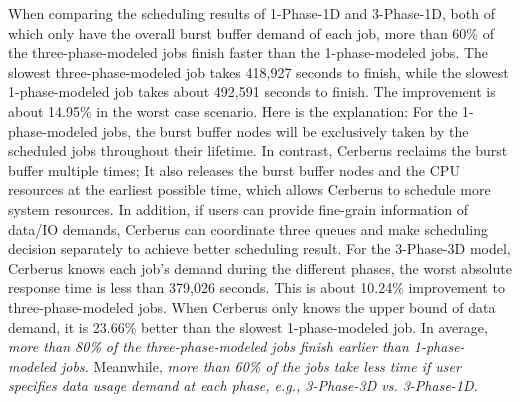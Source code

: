 When comparing the scheduling results of 1-Phase-1D and 3-Phase-1D,
both of which only have the overall burst buffer demand of each job,
more than 60\% of the three-phase-modeled jobs finish faster than the 1-phase-modeled jobs.
The slowest three-phase-modeled job takes 418,927 seconds to finish,
while the slowest 1-phase-modeled job takes about 492,591 seconds to finish.
The improvement is about 14.95\% in the worst case scenario.
Here is the explanation: For the 1-phase-modeled jobs, the burst buffer nodes will be exclusively
taken by the scheduled jobs throughout their lifetime. In contrast, Cerberus reclaims the burst buffer multiple times;
It also releases the burst buffer nodes and the CPU resources at the earliest possible time, which allows Cerberus to schedule more system resources.
In addition, if users can provide fine-grain information of data/IO demands,
Cerberus can coordinate three queues and make scheduling decision separately to achieve better scheduling result.
For the 3-Phase-3D model, Cerberus knows each job's demand during the different phases,
the worst absolute response time is less than 379,026 seconds.
This is about 10.24\% improvement to three-phase-modeled jobs.
When Cerberus only knows the upper bound of data demand,
it is 23.66\% better than the slowest 1-phase-modeled job.
In average, \textit{more than 80\% of the three-phase-modeled jobs
finish earlier than 1-phase-modeled jobs.}
Meanwhile, \textit{more than 60\% of the jobs take less time if user
specifies data usage demand at each phase, e.g., 3-Phase-3D vs. 3-Phase-1D.}



